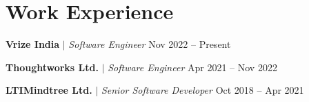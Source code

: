 \section{\textbf{Work Experience}}
\resumeSubHeadingListStart

\resumeProjectHeading
{\textbf{Vrize India} $|$ \emph{Software Engineer}}    {Nov 2022 -- Present}

\vspace{6pt}
\resumeProjectHeading
{\textbf{Thoughtworks Ltd.} $|$ \emph{Software Engineer}}    {Apr 2021 -- Nov 2022}

\vspace{6pt}
\resumeProjectHeading
{\textbf{LTIMindtree Ltd.} $|$ \emph{Senior Software Developer}}    {Oct 2018 -- Apr 2021}

\resumeSubHeadingListEnd